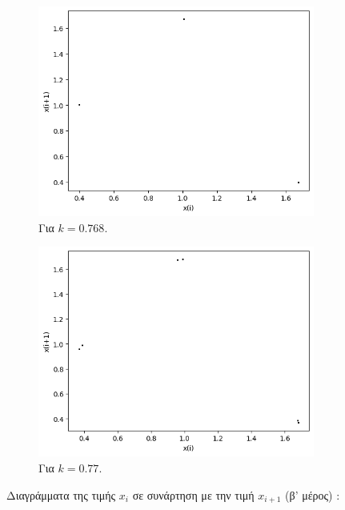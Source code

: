 \begin{figure}[h!]
\begin{subfigure}[b]{0.4\textwidth}
		\includegraphics[width=\textwidth]{LateX images/graphs q14/g23}
		\caption{Για $k=0.768$.}
		\label{f:k83}
	\end{subfigure}
	\hfill
	\begin{subfigure}[b]{0.4\textwidth}
		\centering
		\includegraphics[width=\textwidth]{LateX images/graphs q14/g24}
		\caption{Για $k=0.77$.}
		\label{f:k80}
	\end{subfigure}
	\hfill
	\caption{Διαγράμματα της τιμής \(x_i\) σε συνάρτηση με την τιμή \(x_{i+1}\) (β' μέρος) :}
\end{figure}
